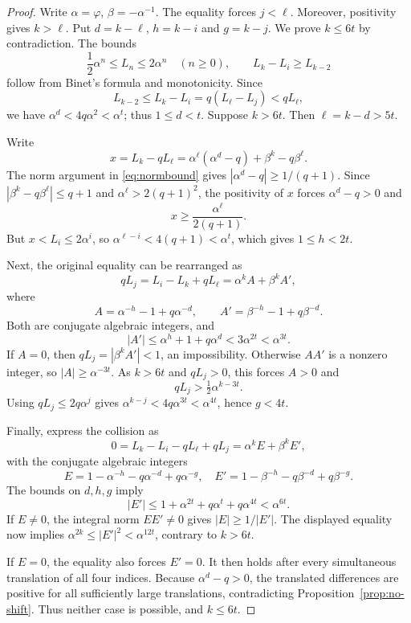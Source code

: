 \documentclass[11pt]{article}
\begin{document}
\begin{proof}
Write $\alpha=\varphi$, $\beta=-\alpha^{-1}$.
The equality forces $j<\ell$.
Moreover, positivity gives $k>\ell$.
Put $d=k-\ell$, $h=k-i$ and $g=k-j$.
We prove $k\le6t$ by contradiction.
The bounds
\[
\frac12\alpha^n\le L_n\le2\alpha^n
\quad(n\ge0),\qquad
L_k-L_i\ge L_{k-2}
\]
follow from Binet's formula and monotonicity.
Since
\[
L_{k-2}\le L_k-L_i
=q(L_\ell-L_j)<qL_\ell,
\]
we have $\alpha^d<4q\alpha^2<\alpha^t$;
thus $1\le d<t$. Suppose $k>6t$.
Then $\ell=k-d>5t$.

Write
\[
x=L_k-qL_\ell
 =\alpha^\ell(\alpha^d-q)+\beta^k-q\beta^\ell.
\]
The norm argument in \eqref{eq:normbound} gives
$|\alpha^d-q|\ge1/(q+1)$.
Since $|\beta^k-q\beta^\ell|\le q+1$
and $\alpha^\ell>2(q+1)^2$, the positivity
of $x$ forces $\alpha^d-q>0$ and
\[
x\ge\frac{\alpha^\ell}{2(q+1)}.
\]
But $x<L_i\le2\alpha^i$, so
$\alpha^{\ell-i}<4(q+1)<\alpha^t$,
which gives $1\le h<2t$.

Next, the original equality can be rearranged as
\[
qL_j=L_i-L_k+qL_\ell
=\alpha^k A+\beta^k A',
\]
where
\[
A=\alpha^{-h}-1+q\alpha^{-d},\qquad
A'=\beta^{-h}-1+q\beta^{-d}.
\]
Both are conjugate algebraic integers, and
\[
|A'|\le\alpha^h+1+q\alpha^d
<3\alpha^{2t}<\alpha^{3t}.
\]
If $A=0$, then $qL_j=|\beta^k A'|<1$,
an impossibility.
Otherwise $AA'$ is a nonzero integer, so
$|A|\ge\alpha^{-3t}$.
As $k>6t$ and $qL_j>0$, this forces $A>0$ and
\[
qL_j>\tfrac12\alpha^{k-3t}.
\]
Using $qL_j\le2q\alpha^j$ gives
$\alpha^{k-j}<4q\alpha^{3t}<\alpha^{4t}$,
hence $g<4t$.

Finally, express the collision as
\[
0=L_k-L_i-qL_\ell+qL_j
=\alpha^k E+\beta^k E',
\]
with the conjugate algebraic integers
\[
E=1-\alpha^{-h}-q\alpha^{-d}+q\alpha^{-g},
\quad
E'=1-\beta^{-h}-q\beta^{-d}+q\beta^{-g}.
\]
The bounds on $d,h,g$ imply
\[
|E'|\le1+\alpha^{2t}+q\alpha^t+q\alpha^{4t}
<\alpha^{6t}.
\]
If $E\ne0$, the integral norm $EE'\ne0$
gives $|E|\ge1/|E'|$.
The displayed equality now implies
$\alpha^{2k}\le|E'|^2<\alpha^{12t}$,
contrary to $k>6t$.

If $E=0$, the equality also forces $E'=0$.
It then holds after every simultaneous translation
of all four indices. Because $\alpha^d-q>0$,
the translated differences are positive for all
sufficiently large translations, contradicting
Proposition~\ref{prop:no-shift}.
Thus neither case is possible, and $k\le6t$.
\end{proof}
\end{document}
